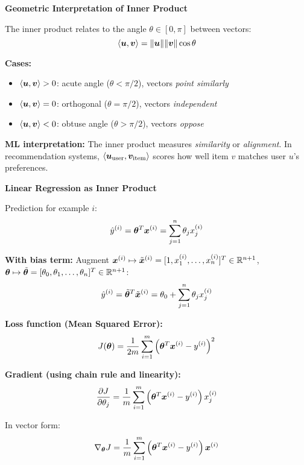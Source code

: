 \begin{intuitionbox}
    \textbf{Geometric Interpretation of Inner Product}

    The inner product relates to the angle $\theta \in [0, \pi]$ between vectors:
    \[
        \langle \bm{u}, \bm{v} \rangle = \|\bm{u}\| \|\bm{v}\| \cos\theta
    \]

    \textbf{Cases:}
    \begin{itemize}
    \item $\langle \bm{u}, \bm{v} \rangle > 0$: acute angle ($\theta < \pi/2$), vectors \emph{point similarly}
    \item $\langle \bm{u}, \bm{v} \rangle = 0$: orthogonal ($\theta = \pi/2$), vectors \emph{independent}
    \item $\langle \bm{u}, \bm{v} \rangle < 0$: obtuse angle ($\theta > \pi/2$), vectors \emph{oppose}
    \end{itemize}

    \textbf{ML interpretation:} The inner product measures \textit{similarity} or \textit{alignment}. In recommendation systems, $\langle \bm{u}_{\text{user}}, \bm{v}_{\text{item}} \rangle$ scores how well item $v$ matches user $u$'s preferences.
\end{intuitionbox}

\begin{mlbox}
    \textbf{Linear Regression as Inner Product}

    Prediction for example $i$:
    \[
        \hat{y}^{(i)} = \bm{\theta}^T \bm{x}^{(i)} = \sum_{j=1}^{n} \theta_j x_j^{(i)}
    \]

    \textbf{With bias term:} Augment $\bm{x}^{(i)} \mapsto \tilde{\bm{x}}^{(i)} = [1, x_1^{(i)}, \ldots, x_n^{(i)}]^T \in \mathbb{R}^{n+1}$, $\bm{\theta} \mapsto \tilde{\bm{\theta}} = [\theta_0, \theta_1, \ldots, \theta_n]^T \in \mathbb{R}^{n+1}$:
    \[
        \hat{y}^{(i)} = \tilde{\bm{\theta}}^T \tilde{\bm{x}}^{(i)} = \theta_0 + \sum_{j=1}^{n} \theta_j x_j^{(i)}
    \]

    \textbf{Loss function (Mean Squared Error):}
    \[
        J(\bm{\theta}) = \frac{1}{2m} \sum_{i=1}^{m} \left(\bm{\theta}^T \bm{x}^{(i)} - y^{(i)}\right)^2
    \]

    \textbf{Gradient (using chain rule and linearity):}
    \[
        \frac{\partial J}{\partial \theta_j} = \frac{1}{m} \sum_{i=1}^{m} \left(\bm{\theta}^T \bm{x}^{(i)} - y^{(i)}\right) x_j^{(i)}
    \]

    In vector form:
    \[
        \nabla_{\bm{\theta}} J = \frac{1}{m} \sum_{i=1}^{m} \left(\bm{\theta}^T \bm{x}^{(i)} - y^{(i)}\right) \bm{x}^{(i)}
    \]
\end{mlbox}

